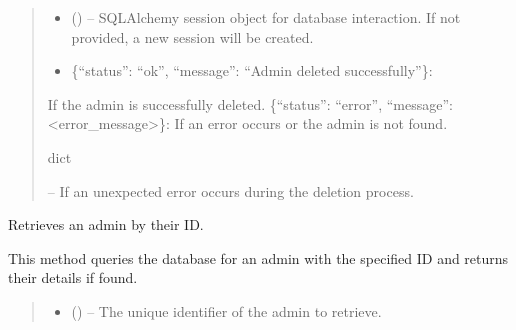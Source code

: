 \documentclass[letterpaper,10pt,english]{sphinxmanual}
\begin{document}
\begin{fulllineitems}
\begin{fulllineitems}
\begin{quote}
\begin{description}
\begin{itemize}
\item {} 
\sphinxAtStartPar
{} (\sphinxstyleliteralemphasis{\sphinxupquote{, }}) – SQLAlchemy session object for database interaction.
If not provided, a new session will be created.

\end{itemize}

\sphinxAtStartPar
\begin{description}
\begin{itemize}
\item {} 
\sphinxAtStartPar
\{“status”: “ok”, “message”: “Admin deleted successfully”\}:

\end{itemize}

\sphinxAtStartPar
If the admin is successfully deleted.
\sphinxhyphen{} \{“status”: “error”, “message”: <error\_message>\}:
If an error occurs or the admin is not found.

\end{description}


\sphinxAtStartPar
dict

\sphinxAtStartPar
{} – If an unexpected error occurs during the deletion process.

\end{description}\end{quote}

\end{fulllineitems}


\begin{fulllineitems}
\label{\detokenize{app.controllers:app.controllers.admin_controller.AdminController.getAdminById}}
\pysigstartsignatures
\pysiglinewithargsret
{}
{\sphinxparamcomma {}}
{}
\pysigstopsignatures
\sphinxAtStartPar
Retrieves an admin by their ID.

\sphinxAtStartPar
This method queries the database for an admin with the specified ID and
returns their details if found.
\begin{quote}\begin{description}
\begin{itemize}
\item {} 
\sphinxAtStartPar
{} () – The unique identifier of the admin to retrieve.


\end{itemize}
\end{description}
\end{quote}
\end{fulllineitems}
\end{fulllineitems}
\end{document}
